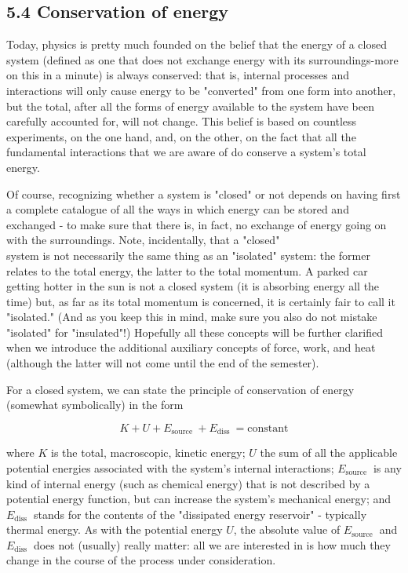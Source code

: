 \documentclass[10pt]{article}
\begin{document}
\subsection*{5.4 Conservation of energy}
Today, physics is pretty much founded on the belief that the energy of a closed system (defined as one that does not exchange energy with its surroundings-more on this in a minute) is always conserved: that is, internal processes and interactions will only cause energy to be "converted" from one form into another, but the total, after all the forms of energy available to the system have been carefully accounted for, will not change. This belief is based on countless experiments, on the one hand, and, on the other, on the fact that all the fundamental interactions that we are aware of do conserve a system's total energy.

Of course, recognizing whether a system is "closed" or not depends on having first a complete catalogue of all the ways in which energy can be stored and exchanged - to make sure that there is, in fact, no exchange of energy going on with the surroundings. Note, incidentally, that a "closed"\\
system is not necessarily the same thing as an "isolated" system: the former relates to the total energy, the latter to the total momentum. A parked car getting hotter in the sun is not a closed system (it is absorbing energy all the time) but, as far as its total momentum is concerned, it is certainly fair to call it "isolated." (And as you keep this in mind, make sure you also do not mistake "isolated" for "insulated"!) Hopefully all these concepts will be further clarified when we introduce the additional auxiliary concepts of force, work, and heat (although the latter will not come until the end of the semester).

For a closed system, we can state the principle of conservation of energy (somewhat symbolically) in the form


\begin{equation*}
K+U+E_{\text {source }}+E_{\text {diss }}=\mathrm{constant} \tag{5.8}
\end{equation*}


where $K$ is the total, macroscopic, kinetic energy; $U$ the sum of all the applicable potential energies associated with the system's internal interactions; $E_{\text {source }}$ is any kind of internal energy (such as chemical energy) that is not described by a potential energy function, but can increase the system's mechanical energy; and $E_{\text {diss }}$ stands for the contents of the "dissipated energy reservoir" - typically thermal energy. As with the potential energy $U$, the absolute value of $E_{\text {source }}$ and $E_{\text {diss }}$ does not (usually) really matter: all we are interested in is how much they change in the course of the process under consideration.
\end{document}
